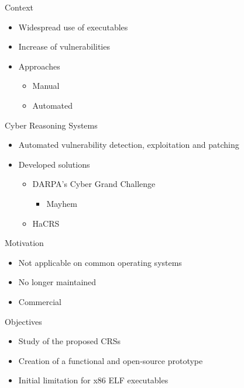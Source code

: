 \documentclass{beamer}
\begin{document}
\begin{frame}{Context} \pause
	\begin{itemize}
		\item Widespread use of executables \pause
	    \item Increase of vulnerabilities \pause
	    \item Approaches \pause
		    \begin{itemize}
		        \item Manual \pause
		        \item Automated
	        \end{itemize}
	\end{itemize}
\end{frame}

\begin{frame}{Cyber Reasoning Systems} \pause
	\begin{itemize}
		\item Automated vulnerability detection, exploitation and patching \pause
	    \item Developed solutions \pause
	    \begin{itemize}
    	    \item DARPA's Cyber Grand Challenge \pause
    		    \begin{itemize}
    		        \item Mayhem \pause
    	        \end{itemize}
            \item HaCRS
        \end{itemize}
	\end{itemize}
\end{frame}

\begin{frame}{Motivation} \pause
	\begin{itemize}
		\item Not applicable on common operating systems\pause
	    \item No longer maintained \pause
	    \item Commercial \pause
	\end{itemize}
\end{frame}

\begin{frame}{Objectives} \pause
	\begin{itemize}
		\item Study of the proposed CRSs \pause
	    \item Creation of a functional and open-source prototype \pause
	    \item Initial limitation for x86 ELF executables \pause
	\end{itemize}
\end{frame}
\end{document}
